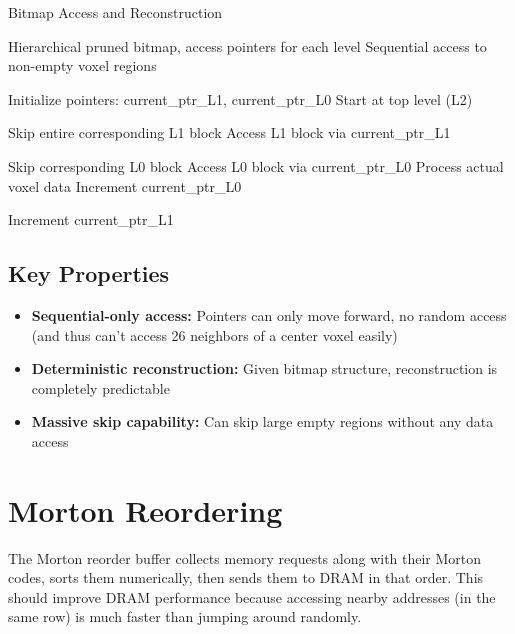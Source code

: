 \documentclass[12pt]{article}
\begin{document}
\begin{algorithm}
\caption{Bitmap Access and Reconstruction}
\begin{algorithmic}
\REQUIRE Hierarchical pruned bitmap, access pointers for each level
\ENSURE Sequential access to non-empty voxel regions

\STATE Initialize pointers: current\_ptr\_L1, current\_ptr\_L0
\STATE Start at top level (L2)

        \STATE Skip entire corresponding L1 block
    \ELSE
        \STATE Access L1 block via current\_ptr\_L1
        
                \STATE Skip corresponding L0 block
            \ELSE
                \STATE Access L0 block via current\_ptr\_L0
                \STATE Process actual voxel data
                \STATE Increment current\_ptr\_L0
            \ENDIF
        \ENDFOR
        
        \STATE Increment current\_ptr\_L1
    \ENDIF
\ENDFOR
\end{algorithmic}
\end{algorithm}

\subsection{Key Properties}
\begin{itemize}
    \item \textbf{Sequential-only access:} Pointers can only move forward, no random access (and thus can't access 26 neighbors of a center voxel easily)
    \item \textbf{Deterministic reconstruction:} Given bitmap structure, reconstruction is completely predictable
    \item \textbf{Massive skip capability:} Can skip large empty regions without any data access
\end{itemize}

\section{Morton Reordering}

The Morton reorder buffer collects memory requests along with their Morton codes, sorts them numerically, then sends them to DRAM in that order. This should improve DRAM performance because accessing nearby addresses (in the same row) is much faster than jumping around randomly.
\end{document}
